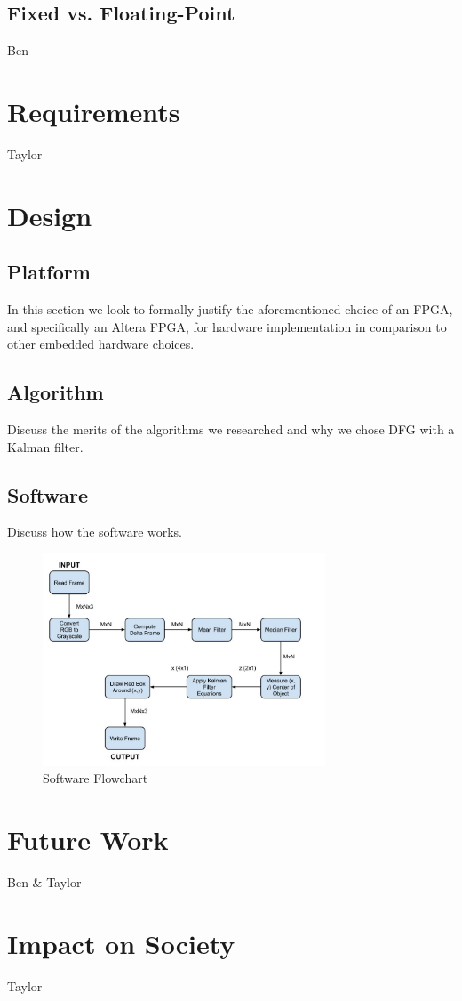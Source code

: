 \documentclass[12pt]{article} %
\begin{document}
\subsection{Fixed vs. Floating-Point}
Ben
\section{Requirements}
Taylor
\section{Design}
\subsection{Platform}
In this section we look to formally justify the aforementioned choice of an FPGA, and specifically an Altera FPGA, for hardware implementation in comparison to other embedded hardware choices. 
\subsection{Algorithm}
Discuss the merits of the algorithms we researched and why we chose DFG with a Kalman filter.
\subsection{Software}
Discuss how the software works.
\begin{figure}[h]
\centering
\includegraphics[width=0.75\textwidth]{./images/software_flow.jpg}
\caption{Software Flowchart}
\label{fig:sw_flow}    
\end{figure}
\section{Future Work}
Ben \& Taylor
\section{Impact on Society}
Taylor
\end{document}
